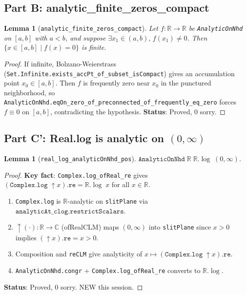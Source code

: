 \documentclass[12pt]{article}
\newtheorem{lemma}[theorem]{Lemma}
\theoremstyle{definition}
\begin{document}
\subsection{Part B: analytic\_finite\_zeros\_compact}

\begin{lemma}[\texttt{analytic\_finite\_zeros\_compact}]
Let $f : \mathbb{R} \to \mathbb{R}$ be \texttt{AnalyticOnNhd} on $[a,b]$ with $a < b$,
and suppose $\exists x_1 \in (a,b),\, f(x_1) \neq 0$.
Then $\{x \in [a,b] \mid f(x) = 0\}$ is finite.
\end{lemma}
\begin{proof}
If infinite, Bolzano-Weierstrass (\texttt{Set.Infinite.exists\_accPt\_of\_subset\_isCompact})
gives an accumulation point $x_0 \in [a,b]$.  Then $f$ is frequently zero near $x_0$
in the punctured neighborhood, so \texttt{AnalyticOnNhd.eqOn\_zero\_of\_preconnected\_of\_frequently\_eq\_zero}
forces $f \equiv 0$ on $[a,b]$, contradicting the hypothesis.
\textbf{Status}: \textcolor{proved}{Proved, 0 sorry.}
\end{proof}

\subsection{Part C': Real.log is analytic on $(0,\infty)$}

\begin{lemma}[\texttt{real\_log\_analyticOnNhd\_pos}]
$\texttt{AnalyticOnNhd}\;\mathbb{R}\;\mathbb{R}.\log\;(0,\infty)$.
\end{lemma}
\begin{proof}
\textbf{Key fact}: \texttt{Complex.log\_ofReal\_re} gives $(\texttt{Complex.log}\;\uparrow x).\texttt{re} = \mathbb{R}.\log\;x$
for all $x \in \mathbb{R}$.
\begin{enumerate}
  \item \texttt{Complex.log} is $\mathbb{R}$-analytic on \texttt{slitPlane} via
        $\texttt{analyticAt\_clog}.\texttt{restrictScalars}$.
  \item $\uparrow(\cdot) : \mathbb{R} \to \mathbb{C}$ (ofRealCLM) maps $(0,\infty)$ into
        \texttt{slitPlane} since $x > 0$ implies $(\uparrow x).\texttt{re} = x > 0$.
  \item Composition and \texttt{reCLM} give analyticity of
        $x \mapsto (\texttt{Complex.log}\;\uparrow x).\texttt{re}$.
  \item \texttt{AnalyticOnNhd.congr} + \texttt{Complex.log\_ofReal\_re} converts to $\mathbb{R}.\log$.
\end{enumerate}
\textbf{Status}: \textcolor{proved}{Proved, 0 sorry. NEW this session.}
\end{proof}
\end{document}
